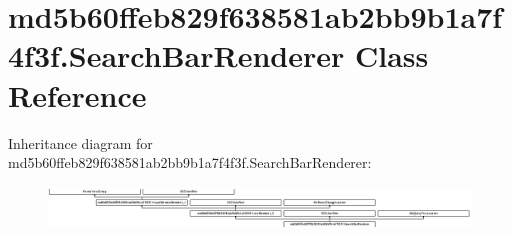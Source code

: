 \hypertarget{classmd5b60ffeb829f638581ab2bb9b1a7f4f3f_1_1SearchBarRenderer}{}\section{md5b60ffeb829f638581ab2bb9b1a7f4f3f.\+Search\+Bar\+Renderer Class Reference}
\label{classmd5b60ffeb829f638581ab2bb9b1a7f4f3f_1_1SearchBarRenderer}
Inheritance diagram for md5b60ffeb829f638581ab2bb9b1a7f4f3f.\+Search\+Bar\+Renderer\+:\begin{figure}[H]
\begin{center}
\leavevmode
\includegraphics[height=1.122807cm]{classmd5b60ffeb829f638581ab2bb9b1a7f4f3f_1_1SearchBarRenderer}
\end{center}
\end{figure}
